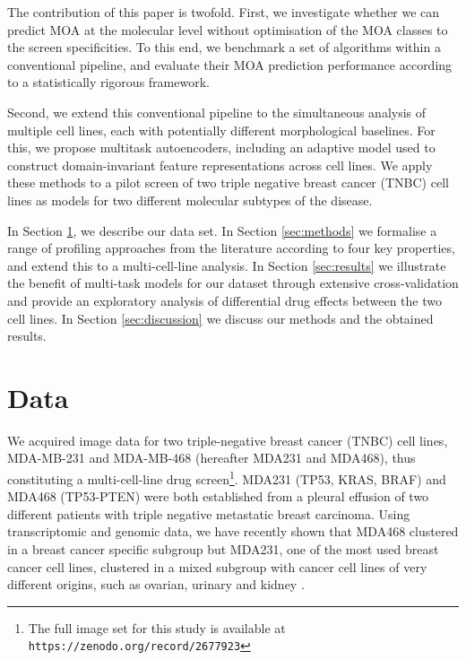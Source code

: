 The contribution of this paper is twofold. First, we investigate whether we can predict MOA at the molecular level without optimisation of the MOA classes to the screen specificities. To this end, we benchmark a set of algorithms within a conventional pipeline, and evaluate their MOA prediction performance according to a statistically rigorous framework.

Second, we extend this conventional pipeline to the simultaneous analysis of multiple cell lines, each with potentially different morphological baselines. For this, we propose multitask autoencoders, including an adaptive model used to construct domain-invariant feature representations across cell lines. We apply these methods to a pilot screen of two triple negative breast cancer (TNBC) cell lines as models for two different molecular subtypes of the disease.

In Section \ref{sec:data}, we describe our data set. In Section \ref{sec:methods} we formalise a range of profiling approaches from the literature according to four key properties, and extend this to a multi-cell-line analysis. In Section \ref{sec:results} we illustrate the benefit of multi-task models for our dataset through extensive cross-validation and provide an exploratory analysis of differential drug effects between the two cell lines. In Section \ref{sec:discussion} we discuss our methods and the obtained results.




\section{Data}
\label{sec:data}
We acquired image data for two triple-negative breast cancer (TNBC) cell lines, MDA-MB-231 and MDA-MB-468 (hereafter MDA231 and MDA468), thus constituting a multi-cell-line drug screen\footnote{The full image set for this study is available at \texttt{https://zenodo.org/record/2677923}}. {MDA231 (TP53, KRAS, BRAF) and MDA468 (TP53-PTEN) were both established from a pleural effusion of two different patients with triple negative metastatic breast carcinoma. Using transcriptomic and genomic data, we have recently shown that MDA468 clustered in a breast cancer specific subgroup but MDA231, one of the most used breast cancer cell lines, clustered in a mixed subgroup with cancer cell lines of very different origins, such as ovarian, urinary and kidney \cite{Sadacca2017}.}

